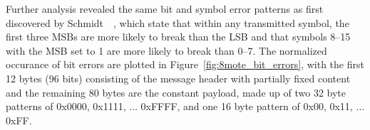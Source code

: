 Further analysis revealed the same bit and symbol error patterns as first discovered by Schmidt~\etal~\cite{Schmidt2013}, which state that within any transmitted symbol, the first three \acp{MSB} are more likely to break than the \ac{LSB} and that symbols 8--15 with the \ac{MSB} set to 1 are more likely to break than 0--7.
The normalized occurance of bit errors are plotted in Figure~\ref{fig:8mote_bit_errors}, with the first 12 bytes (96 bits) consisting of the message header with partially fixed content and the remaining 80 bytes are the constant payload, made up of two 32 byte patterns of 0x0000, 0x1111, $\ldots$ 0xFFFF, and one 16 byte pattern of 0x00, 0x11, $\ldots$ 0xFF.

\begin{figure}[t]
	\subfigure[S] {
}
\end{figure}
